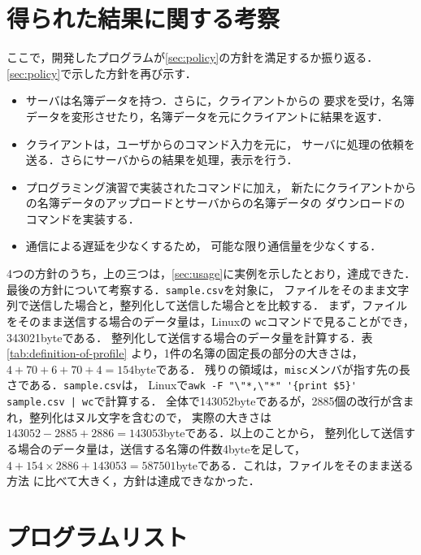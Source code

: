 \documentclass[a4j,10pt]{jarticle}
\begin{document}
\section{得られた結果に関する考察}
\label{sec:concl}
ここで，開発したプログラムが\ref{sec:policy}の方針を満足するか振り返る．
\ref{sec:policy}で示した方針を再び示す．
\begin{itemize}
\item\label{item:req:srv} サーバは名簿データを持つ．さらに，クライアントからの
  要求を受け，名簿データを変形させたり，名簿データを元にクライアントに結果を返す．
\item\label{item:req:cln} クライアントは，ユーザからのコマンド入力を元に，
  サーバに処理の依頼を送る．さらにサーバからの結果を処理，表示を行う．
\item\label{item:req:cmd} プログラミング演習で実装されたコマンドに加え，
  新たにクライアントからの名簿データのアップロードとサーバからの名簿データの
  ダウンロードのコマンドを実装する．
\item\label{item:req:cmn} 通信による遅延を少なくするため，
  可能な限り通信量を少なくする．
\end{itemize}
4つの方針のうち，上の三つは，\ref{sec:usage}に実例を示したとおり，達成できた．
最後の方針について考察する．\verb|sample.csv|を対象に，
ファイルをそのまま文字列で送信した場合と，整列化して送信した場合とを比較する．
まず，ファイルをそのまま送信する場合のデータ量は，Linuxの
\verb|wc|コマンドで見ることができ，343021byteである．
整列化して送信する場合のデータ量を計算する．表\ref{tab:definition-of-profile}
より，1件の名簿の固定長の部分の大きさは，$4+70+6+70+4=154$byteである．
残りの領域は，\verb|misc|メンバが指す先の長さである．\verb|sample.csv|は，
Linuxで\verb^awk -F "\"*,\"*" '{print $5}' sample.csv | wc^で計算する．
全体で143052byteであるが，2885個の改行が含まれ，整列化はヌル文字を含むので，
実際の大きさは$143052-2885+2886=143053$byteである．以上のことから，
整列化して送信する場合のデータ量は，送信する名簿の件数4byteを足して，
$4+154\times 2886+143053=587501$byteである．これは，ファイルをそのまま送る方法
に比べて大きく，方針は達成できなかった．
\newpage

\appendix
\section{プログラムリスト}


\end{document}
